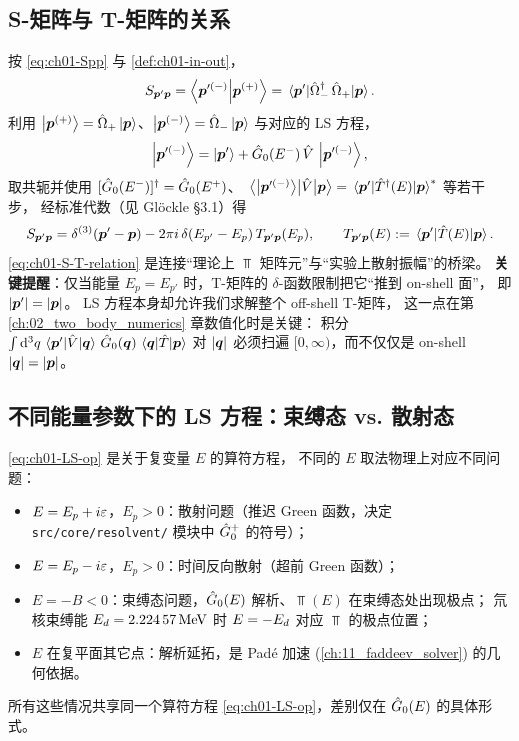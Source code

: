 \subsection{S-矩阵与 T-矩阵的关系}

按 \cref{eq:ch01-Spp} 与 \cref{def:ch01-in-out}，
\begin{equation}
  S_{\bvec{p}'\bvec{p}}
  = \braket{\bvec{p}'^{(-)}}{\bvec{p}^{(+)}}
  = \matrixel{\bvec{p}'}{\Mollerm^{\dagger}\,\Mollerp}{\bvec{p}}.
  \label{eq:ch01-Sdef-elem}
\end{equation}
利用 $\ket{\bm{p}^{(+)}} = \hat{\Omega}_{+}\ket{\bm{p}}$、$\ket{\bm{p}^{(-)}} = \hat{\Omega}_{-}\ket{\bm{p}}$
与对应的 LS 方程，
\begin{equation}
  \ket{\bm{p}'^{(-)}} = \ket{\bm{p}'} + \hat{G}_0(E^-)\, \hat{V}\, \ket{\bm{p}'^{(-)}},
\end{equation}
取共轭并使用 $[\hat{G}_0(E^-)]^{\dagger} = \hat{G}_0(E^+)$、
$\matrixel{\stateout{\bvec{p}'}}{\Vop}{\bvec{p}} = \matrixel{\bvec{p}'}{\Top^{\dagger}(E)}{\bvec{p}}^*$ 等若干步，
经标准代数（见 Glöckle \cite{Glockle1983} §3.1）得
\begin{equation}
  S_{\bvec{p}'\bvec{p}}
  = \delta^{(3)}(\bvec{p}' - \bvec{p})
    - 2\pi i\, \delta(E_{p'} - E_p)\, T_{\bvec{p}'\bvec{p}}(E_p),
  \qquad
  T_{\bvec{p}'\bvec{p}}(E) := \matrixel{\bvec{p}'}{\Top(E)}{\bvec{p}}.
  \label{eq:ch01-S-T-relation}
\end{equation}
\cref{eq:ch01-S-T-relation} 是连接“理论上 $\Top$ 矩阵元”与“实验上散射振幅”的桥梁。
\textbf{关键提醒}：仅当能量 $E_p = E_{p'}$ 时，T-矩阵的 $\delta$-函数限制把它“推到 on-shell 面”，
即 $|\bm{p}'| = |\bm{p}|$。
LS 方程本身却允许我们求解整个 off-shell T-矩阵，
这一点在第 \ref{ch:02_two_body_numerics} 章数值化时是关键：
积分 $\int \dd^3 q\, \matrixel{\bvec{p}'}{\Vop}{\bvec{q}}\, \Gzero(\bvec{q})\, \matrixel{\bvec{q}}{\Top}{\bvec{p}}$
对 $|\bm{q}|$ 必须扫遍 $[0, \infty)$，而不仅仅是 on-shell $|\bm{q}| = |\bm{p}|$。

\subsection{不同能量参数下的 LS 方程：束缚态 vs. 散射态}

\cref{eq:ch01-LS-op} 是关于复变量 $E$ 的算符方程，
不同的 $E$ 取法物理上对应不同问题：
\begin{itemize}
  \item $E = E_p + i\varepsilon$，$E_p > 0$：散射问题（推迟 Green 函数，决定 \texttt{src/core/resolvent/} 模块中 $\hat{G}_0^+$ 的符号）；
  \item $E = E_p - i\varepsilon$，$E_p > 0$：时间反向散射（超前 Green 函数）；
  \item $E = -B < 0$：束缚态问题，$\hat{G}_0(E)$ 解析、$\Top(E)$ 在束缚态处出现极点；
        氘核束缚能 $E_d = \SI{2.22457}{MeV}$ 时 $E = -E_d$ 对应 $\Top$ 的极点位置；
  \item $E$ 在复平面其它点：解析延拓，是 Padé 加速 (\cref{ch:11_faddeev_solver}) 的几何依据。
\end{itemize}
所有这些情况共享同一个算符方程 \cref{eq:ch01-LS-op}，差别仅在 $\hat{G}_0(E)$ 的具体形式。


